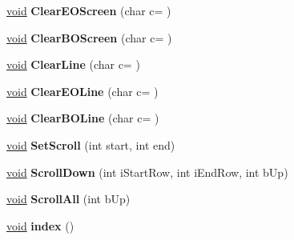 \begin{DoxyCompactItemize}
\item 
\mbox{\label{class_t_console_a7fc9715970b8db541fb3269fd4bbcd6f}} 
\hyperlink{interfacevoid}{void} {\bfseries Clear\+E\+O\+Screen} (char c=\textquotesingle{} \textquotesingle{})
\item 
\mbox{\label{class_t_console_a94676814086d4808d2e742baa2e8c95e}} 
\hyperlink{interfacevoid}{void} {\bfseries Clear\+B\+O\+Screen} (char c=\textquotesingle{} \textquotesingle{})
\item 
\mbox{\label{class_t_console_a12f3284dc535145eb377a5e57c26746f}} 
\hyperlink{interfacevoid}{void} {\bfseries Clear\+Line} (char c=\textquotesingle{} \textquotesingle{})
\item 
\mbox{\label{class_t_console_af7a874d3678ef3d001e71ed652cd14ca}} 
\hyperlink{interfacevoid}{void} {\bfseries Clear\+E\+O\+Line} (char c=\textquotesingle{} \textquotesingle{})
\item 
\mbox{\label{class_t_console_abb63991386147c07686d798cc6565133}} 
\hyperlink{interfacevoid}{void} {\bfseries Clear\+B\+O\+Line} (char c=\textquotesingle{} \textquotesingle{})
\item 
\mbox{\label{class_t_console_a46897fa4214247b46a09e68e2d3d41fb}} 
\hyperlink{interfacevoid}{void} {\bfseries Set\+Scroll} (int start, int end)
\item 
\mbox{\label{class_t_console_a40c862ee4c09b47d48543e0eb95b8ee5}} 
\hyperlink{interfacevoid}{void} {\bfseries Scroll\+Down} (int i\+Start\+Row, int i\+End\+Row, int b\+Up)
\item 
\mbox{\label{class_t_console_a0c0784c9d8a98571131615adee56b011}} 
\hyperlink{interfacevoid}{void} {\bfseries Scroll\+All} (int b\+Up)
\item 
\mbox{\label{class_t_console_a408835193cea986d6d36f2c07326a8d9}} 
\hyperlink{interfacevoid}{void} {\bfseries index} ()
\item 
\mbox{\label{class_t_console_a63f979c2be1ed284446b3f366ee19294}} 

\end{DoxyCompactItemize}
